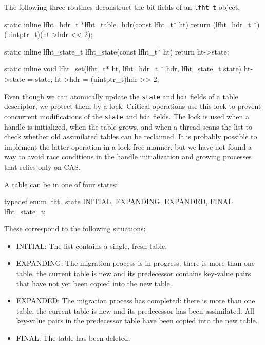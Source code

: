 The following three routines deconstruct the bit fields of an \texttt{lfht\_t} object.
\begin{center}
\begin{clisting}
static inline lfht_hdr_t *lfht_table_hdr(const lfht_t* ht){
  return (lfht_hdr_t *)(uintptr_t)(ht->hdr << 2);
}

static inline lfht_state_t lfht_state(const lfht_t* ht){
  return ht->state;
}

static inline void lfht_set(lfht_t* ht, lfht_hdr_t * hdr, lfht_state_t state){
  ht->state = state;
  ht->hdr = (uintptr_t)hdr >> 2;
}
\end{clisting}
\end{center}


Even though we can atomically update the \texttt{state} and
\texttt{hdr} fields of a table descriptor, we protect them by a lock.
Critical operations use this lock to prevent concurrent modifications
of the \texttt{state} and \texttt{hdr} fields. The lock is used when a
handle is initialized, when the table grows, and when a thread scans
the list to check whether old assimilated tables can be reclaimed.
It is probably possible to implement the latter operation in a
lock-free manner, but we have not found a way to avoid race conditions
in the handle initialization and growing processes that relies only on CAS.


A table can be in one of four states:
\begin{center}
\begin{clisting}
  typedef enum lfht_state {
    INITIAL,
    EXPANDING,
    EXPANDED,
    FINAL
  } lfht_state_t;
\end{clisting}
\end{center}
These correspond to the following situations:
\begin{itemize}
\item INITIAL: The list contains a single, fresh table.
\item EXPANDING: The migration process is in progress: there is more
  than one table, the current table is new and its predecessor
  contains key-value pairs that have not yet been copied into the new
  table.
\item EXPANDED: The migration process has completed: there is more
  than one table, the current table is new and its predecessor has
  been assimilated. All key-value pairs in the predecessor table have
  been copied into the new table.
\item FINAL: The table has been deleted.
\end{itemize}
  
